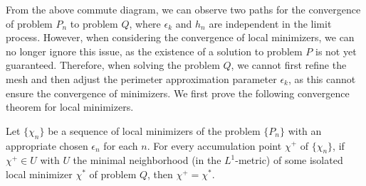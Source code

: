 \documentclass{amsart}
\begin{document}
From the above commute diagram, we can observe two paths for the convergence of problem $   P_n   $ to problem $   Q   $, where $  \epsilon_k  $ and $h_n$ are independent in the limit process. However, when considering the convergence of local minimizers, we can no longer ignore this issue, as the existence of a solution to problem $P$ is not yet guaranteed. Therefore, when solving the problem $Q$, we cannot first refine the mesh and then adjust the perimeter approximation parameter $  \epsilon_k  $, as this cannot ensure the convergence of minimizers. We first prove the following convergence theorem for local minimizers. 
\begin{theorem}
     Let $\{\chi_n\}$ be a sequence of local minimizers of the problem $\{P_n\}$ with an appropriate chosen $  \epsilon_n  $ for each $n$. For every accumulation point $\chi^+$ of $\{\chi_n\}  $, if $  \chi^+ \in U$ with $U$ the minimal neighborhood (in the $   L^1   $-metric) of some isolated local minimizer $\chi^*$ of problem $Q$, then $\chi^+ = \chi^*$.
\end{theorem}
\end{document}
